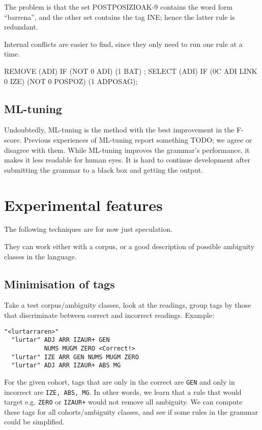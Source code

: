 \documentclass[11pt]{article}
\def\t#1{\texttt{#1}}
\begin{document}
\noindent The problem is that the set POSTPOSIZIOAK-9 contains the word form ``barrena'', and the other set contains the tag INE; hence the latter rule is redundant.

Internal conflicts are easier to find, since they only need to run one rule at a time. 

REMOVE (ADI) IF (NOT 0 ADI) (1 BAT) ;
SELECT (ADI) IF (0C ADI LINK 0 IZE) (NOT 0 POSPOZ) (1 ADPOSAG);

\subsection{ML-tuning}

Undoubtedly, ML-tuning is the method with the best improvement in the F-score. 
Previous experiences of ML-tuning \cite{bick2013tuning,bick_hagen2015obt} report something TODO; we agree or disagree with them.
While ML-tuning improves the grammar's performance, it makes it less readable for human eyes.
It is hard to continue development after submitting the grammar to a black box and getting the output.


\section{Experimental features}

The following techniques are for now just speculation.

They can work either with a corpus, or a good description of possible ambiguity classes in the language.

\subsection{Minimisation of tags}


Take a test corpus/ambiguity classes, look at the readings, 
group tags by those that discriminate between correct and incorrect readings.
Example:

\begin{verbatim}
"<lurtarraren>"
  "lurtar" ADJ ARR IZAUR+ GEN 
           NUMS MUGM ZERO <Correct!>
  "lurtar" IZE ARR GEN NUMS MUGM ZERO 
  "lurtar" ADJ ARR IZAUR+ ABS MG
\end{verbatim}

For the given cohort, tags that are only in the correct are \t{GEN} and only in incorrect are \t{IZE, ABS, MG}.
In other words, we learn that a rule that would target e.g. \t{ZERO} or \t{IZAUR+} would not remove all ambiguity.
We can compute these tags for all cohorts/ambiguity classes, and see if some rules in the grammar could be simplified.
\end{document}
